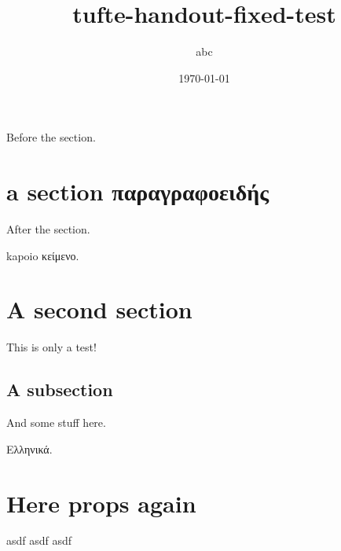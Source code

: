 \documentclass[nofonts]{tufte-handout}
\author{abc}
\date{\today}
\title{tufte-handout-fixed-test}
\begin{document}
\maketitle
Before the section.

\section{a section παραγραφοειδής}
\label{sec-1}

After the section.

kapoio κείμενο.

\section{A second section}
\label{sec-2}



This is only a test!

\subsection{A subsection}
\label{sec-2-1}

And some stuff here.

Ελληνικά.

\section{Here props again}
\label{sec-3}



asdf asdf asdf
\end{document}
